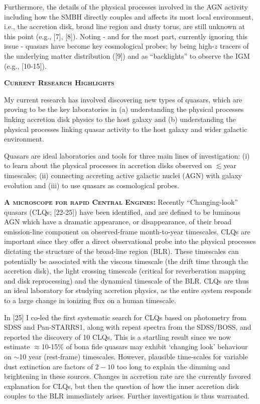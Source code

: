\documentclass[oneside, a4paper, onecolumn, 11pt]{article}
\begin{document}
\smallskip 
\smallskip
\noindent
Furthermore, the details of the physical processes involved in the AGN
activity including how the SMBH directly couples and affects its most
local environment, i.e., the accretion disk, broad line region and
dusty torus, are still unknown at this point (e.g., [7], [8]). Noting
- and for the most part, currently ignoring this issue - quasars have
become key cosmological probes; by being high-$z$ tracers of the
underlying matter distribution ([9]) and as ``backlights'' to observe
the IGM (e.g., [10-15]).


\medskip 
\medskip
\noindent
{\bfseries \large \textsc{\textcolor{Cerulean}{Current Research Highlights}}}

\smallskip
\smallskip
\noindent
My current research has involved discovering new types of quasars,
which are proving to be the key laboratories in (a) understanding the
physical processes linking accretion disk physics to the host galaxy
and (b) understanding the physical processes linking quasar activity
to the host galaxy and wider galactic environment.

\smallskip
\smallskip
\noindent
Quasars are ideal laboratories and tools for
three main lines of investigation: {\rm (i)} to learn about the
physical processes in accretion disks observed on $\lesssim$year
timescales; {\rm (ii)} connecting accreting active galactic nuclei
(AGN) with galaxy evolution and {\rm (iii)} to use quasars as
cosmological probes. 



\smallskip \smallskip
\smallskip
\smallskip
\noindent
\textbf{\textsc{A microscope for rapid Central Engines:}}
Recently ``Changing-look'' quasars (CLQs; [22-25]) have been
identified, and are defined to be luminous AGN which have a dramatic
appearance, or disappearance, of their broad emission-line component
on observed-frame month-to-year timescales.  CLQs are important since
they offer a direct observational probe into the physical processes
dictating the structure of the broad-line region (BLR). These
timescales can potentially be associated with the viscous timescale
(the drift time through the accretion disk), the light crossing
timescale (critical for reverberation mapping and disk reprocessing)
and the dynamical timescale of the BLR.  CLQs are thus an ideal
laboratory for studying accretion physics, as the entire system
responds to a large change in ionizing flux on a human timescale.

\smallskip \smallskip
\noindent 
In [25] I co-led the first systematic search for CLQs based on
photometry from SDSS and Pan-STARRS1, along with repeat spectra from
the SDSS/BOSS, and reported the discovery of 10 CLQs. This is a
startling result since we now estimate $\approx$10-15\% of bona fide
quasars may exhibit `changing look' behaviour on $\sim$10 year 
(rest-frame) timescales. However, plausible time-scales for variable
dust extinction are factors of $2-10$ too long to explain the dimming
and brightening in these sources.  Changes in accretion rate are the
currently favored explanation for CLQs, but then the question of how
the inner accretion disk couples to the BLR immediately
arises. Further investigation is thus warranted.
\end{document}
